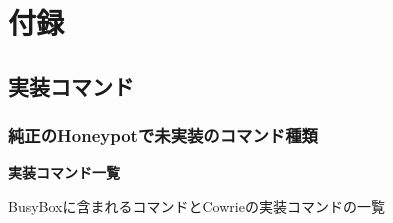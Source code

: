 \appendix
\chapter{付録}
\label{appd}

\section{実装コマンド}

\subsection{純正のHoneypotで未実装のコマンド種類}
\label{appd:kindofcommand}

\begin{center}
\large{\textbf{実装コマンド一覧}}
\end{center}

BusyBoxに含まれるコマンドとCowrieの実装コマンドの一覧
 
